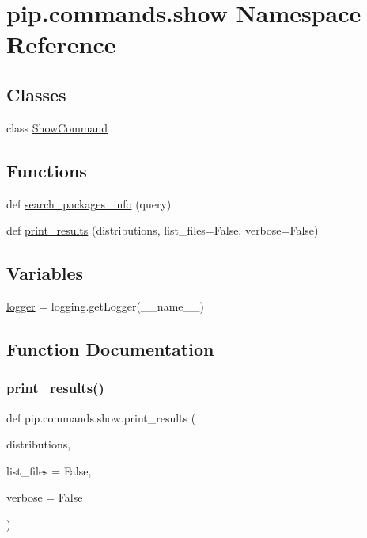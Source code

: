 \hypertarget{namespacepip_1_1commands_1_1show}{}\section{pip.\+commands.\+show Namespace Reference}
\label{namespacepip_1_1commands_1_1show}
\subsection*{Classes}
\begin{DoxyCompactItemize}
\item 
class \hyperlink{classpip_1_1commands_1_1show_1_1_show_command}{Show\+Command}
\end{DoxyCompactItemize}
\subsection*{Functions}
\begin{DoxyCompactItemize}
\item 
def \hyperlink{namespacepip_1_1commands_1_1show_afd8a3b42fbe9b5e1f7c0b1f301ed08e0}{search\+\_\+packages\+\_\+info} (query)
\item 
def \hyperlink{namespacepip_1_1commands_1_1show_a7e252efe03311e675195d5bfbde2b6d5}{print\+\_\+results} (distributions, list\+\_\+files=False, verbose=False)
\end{DoxyCompactItemize}
\subsection*{Variables}
\begin{DoxyCompactItemize}
\item 
\hyperlink{namespacepip_1_1commands_1_1show_a991cd0a12d0cc7cc33b9c012859df7ca}{logger} = logging.\+get\+Logger(\+\_\+\+\_\+name\+\_\+\+\_\+)
\end{DoxyCompactItemize}


\subsection{Function Documentation}
\mbox{\label{namespacepip_1_1commands_1_1show_a7e252efe03311e675195d5bfbde2b6d5}} 
\subsubsection{\texorpdfstring{print\+\_\+results()}{print\_results()}}
{\footnotesize\ttfamily def pip.\+commands.\+show.\+print\+\_\+results (\begin{DoxyParamCaption}\item[{}]{distributions,  }\item[{}]{list\+\_\+files = {\ttfamily False},  }\item[{}]{verbose = {\ttfamily False} }\end{DoxyParamCaption})}

